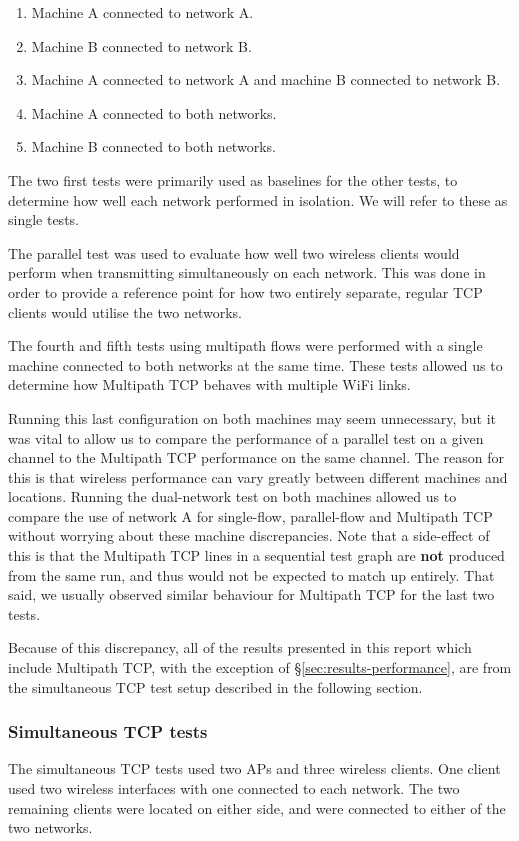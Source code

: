 \begin{enumerate}
  \item Machine A connected to network A.
  \item Machine B connected to network B.
  \item Machine A connected to network A and machine B connected to network B.
  \item Machine A connected to both networks.
  \item Machine B connected to both networks.
\end{enumerate}

The two first tests were primarily used as baselines for the other tests, to determine
how well each network performed in isolation. We will refer to these as single tests.

The parallel test was used to evaluate how well two wireless clients would perform
when transmitting simultaneously on each network. This was done in order to
provide a reference point for how two entirely separate, regular TCP clients
would utilise the two networks.

The fourth and fifth tests using multipath flows were performed with a single machine
connected to both networks at
the same time. These tests allowed us to determine how Multipath TCP behaves
with multiple WiFi links.

Running this last configuration on both machines may seem unnecessary,
but it was vital to allow us to compare the performance of a parallel test on a
given channel to the Multipath TCP performance on the same channel. The reason
for this is that wireless performance can vary greatly between different machines and
locations. Running the dual-network test on both machines allowed us to compare
the use of network A for single-flow, parallel-flow and Multipath TCP without worrying
about these machine discrepancies. Note that a side-effect of this is that the
Multipath TCP lines in a sequential test graph are \textbf{not} produced from the same run, and thus
would not be expected to match up entirely. That said, we usually observed
similar behaviour for Multipath TCP for the last two tests.

Because of this discrepancy, all of the results presented in this report which
include Multipath TCP, with the exception of \S\ref{sec:results-performance}, are
from the simultaneous TCP test setup described in the following section.

\subsubsection{Simultaneous TCP tests}
\label{sec:met:setups:simtcp}
The simultaneous TCP tests used two APs and three
wireless clients. One client used two wireless interfaces with one
connected to each network. The two remaining clients were located on either side, and were connected to either of the two networks.

